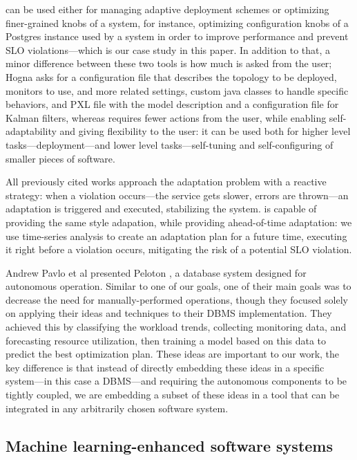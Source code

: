 \projectname{} can be used either for managing adaptive deployment schemes or optimizing finer-grained knobs of a system, for instance, optimizing configuration knobs of a Postgres instance used by a system in order to improve performance and prevent SLO violations---which is our case study in this paper. In addition to that, a minor difference between these two tools is how much is asked from the user; Hogna asks for a configuration file that describes the topology to be deployed, monitors to use, and more related settings, custom java classes to handle specific behaviors, and PXL file with the model description and a configuration file for Kalman filters, whereas \projectname{} requires fewer actions from the user, while enabling self-adaptability and giving flexibility to the user: it can be used both for higher level tasks---deployment---and lower level tasks---self-tuning and self-configuring of smaller pieces of software.

All previously cited works approach the adaptation problem with a reactive strategy: when a violation occurs---the service gets slower, errors are thrown---an adaptation is triggered and executed, stabilizing the system. \projectname{} is capable of providing the same style adapation, while providing ahead-of-time adaptation: we use time-series analysis to create an adaptation plan for a future time, executing it right before a violation occurs, mitigating the risk of a potential SLO violation. 

Andrew Pavlo et al presented Peloton \cite{andrew_pavlo_self-driving_2017}, a database system designed for autonomous operation. Similar to one of our goals, one of their main goals was to decrease the need for manually-performed operations, though they focused solely on applying their ideas and techniques to their DBMS implementation. They achieved this by classifying the workload trends, collecting monitoring data, and forecasting resource utilization, then training a model based on this data to predict the best optimization plan. These ideas are important to our work, the key difference is that instead of directly embedding these ideas in a specific system---in this case a DBMS---and requiring the autonomous components to be tightly coupled, we are embedding a subset of these ideas in a tool that can be integrated in any arbitrarily chosen software system.

\subsection{Machine learning-enhanced software systems}

